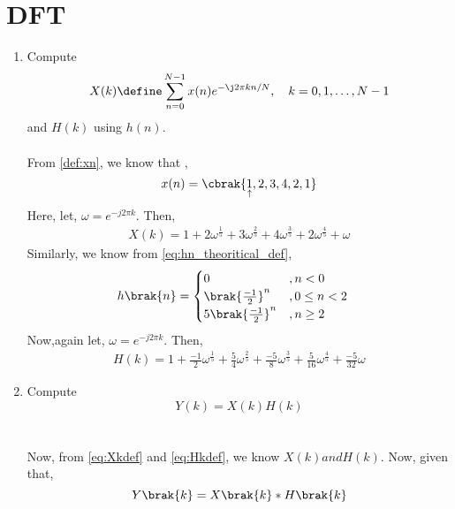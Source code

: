 \documentclass[journal,12pt,twocolumn]{IEEEtran}
\renewcommand\thesection{\arabic{section}}
\begin{document}
\section{DFT}
\begin{enumerate}[label=\thesection.\arabic*]
\item
Compute
\begin{equation}
X(k) \define \sum _{n=0}^{N-1}x(n) e^{-\j2\pi kn/N}, \quad k = 0,1,\dots, N-1
\end{equation}
and $H(k)$ using $h(n)$.
\\\solution\\
From \ref{def:xn}, we know that ,
\begin{equation}
	x(n) = \cbrak{\underset{\uparrow}{1},2,3,4,2,1}
\end{equation}
Here, let, $\omega=e^{-j2\pi k}$. Then,
\begin{align}
	X(k)=1+2\omega^{\frac{1}{5}}+3\omega^{\frac{2}{5}}+4\omega^{\frac{3}{5}}+2\omega^{\frac{4}{5}}+\omega
	\label{eq:Xkdef}
\end{align}
Similarly, we know from \eqref{eq:hn_theoritical_def},
\begin{align}
	h\brak{n} &= \begin{cases}
					 0 &, n < 0\\
					 \brak{\frac{-1}{2}}^n &, 0\leq n<2\\
					 5\brak{\frac{-1}{2}}^n &, n \geq 2
				  \end{cases}
\end{align}
Now,again let, $\omega=e^{-j2\pi k}$. Then,
\begin{align}
	H(k)=1+\frac{-1}{2}\omega^{\frac{1}{5}}+\frac{5}{4}\omega^{\frac{2}{5}}+\frac{-5}{8}\omega^{\frac{3}{5}}+\frac{5}{16}\omega^{\frac{4}{5}}+\frac{-5}{32}\omega
	\label{eq:Hkdef}
\end{align}
\item Compute 
\begin{equation}
	\label{eq:comp_yk}	
	Y(k) = X(k)H(k)
\end{equation}
\\\solution\\Now, from \eqref{eq:Xkdef} and \eqref{eq:Hkdef}, we know $X(k) and H(k)$. Now, given that,
\begin{equation}
	Y\brak{k}=X\brak{k}*H\brak{k}
\end{equation}

\end{enumerate}
\end{document}
